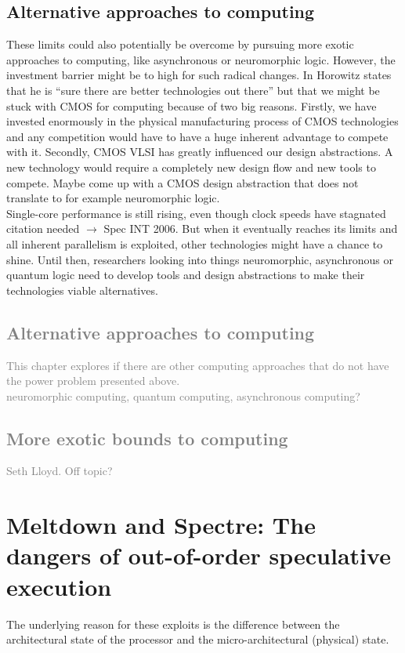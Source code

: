 \documentclass[12pt,a4paper]{article}
\newcommand{\note}{\textcolor{WildStrawberry}}
\newcommand{\greyout}{\textcolor{Gray}}
\begin{document}
\subsection{Alternative approaches to computing}
These limits could also potentially be overcome by pursuing more exotic approaches to computing, like asynchronous or neuromorphic logic. However, the investment barrier might be to high for such radical changes. In \cite{ComputingsEnergyProblem} Horowitz states that he is ``sure there are better technologies out there'' but that we might be stuck with CMOS for computing because of two big reasons. Firstly, we have invested enormously in the physical manufacturing process of CMOS technologies and any competition would have to have a huge inherent advantage to compete with it. Secondly, CMOS VLSI has greatly influenced our design abstractions. A new technology would require a completely new design flow and new tools to compete. \note{Maybe come up with a CMOS design abstraction that does not translate to for example neuromorphic logic.}\\
Single-core performance is still rising, even though clock speeds have stagnated \note{citation needed $\rightarrow$ Spec INT 2006}. But when it eventually reaches its limits and all inherent parallelism is exploited, other technologies might have a chance to shine. Until then, researchers looking into things neuromorphic, asynchronous or quantum logic need to develop tools and design abstractions to make their technologies viable alternatives.

\greyout{
\subsection{Alternative approaches to computing}
This chapter explores if there are other computing approaches that do not have the power problem presented above. \\
\note{neuromorphic computing, quantum computing, asynchronous computing?}
\subsection{More exotic bounds to computing}
\note{Seth Lloyd. Off topic?}
}

\newpage
\label{meltdown}
\section{Meltdown and Spectre: The dangers of out-of-order speculative execution}
\note{The underlying reason for these exploits is the difference between the architectural state of the processor and the micro-architectural (physical) state.}\\
\end{document}
